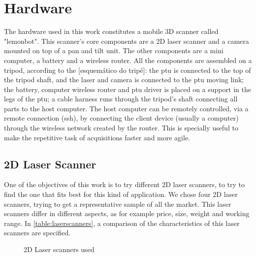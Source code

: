 \section{Hardware}
\label{section:hardware}

The hardware used in this work constitutes a mobile 3D scanner called "lemonbot". This scanner's core components are a 2D laser scanner and a camera mounted on top of a pan and tilt unit. The other components are a mini computer, a battery and a wireless router. All the components are assembled on a tripod, according to the [esquemático do tripé]: the ptu is connected to the top of the tripod shaft, and the laser and camera is connected to the ptu moving link; the battery, computer wireless router and ptu driver is placed on a support in the legs of the ptu; a cable harness runs through the tripod's shaft connecting all parts to the host computer.
The host computer can be remotely controlled, via a remote connection (ssh), by connecting the client device (usually a computer) through the wireless network created by the router. This is specially useful to make the repetitive task of acquisitions faster and more agile.

\subsection{2D Laser Scanner}

One of the objectives of this work is to try different 2D laser scanners, to try to find the one that fits best for this kind of application. We chose four 2D laser scanners, trying to get a representative sample of all the market. This laser scanners differ in different aspects, as for example price, size, weight and working range. In \cref{table:laserscanners}, a comparison of the characteristics of this laser scanners are specified. 

\begin{figure}
    \centering
    \qquad\qquad

    \qquad\qquad

    \caption{2D Laser scanners used}
    \label{figure:laserscanners}
\end{figure}



